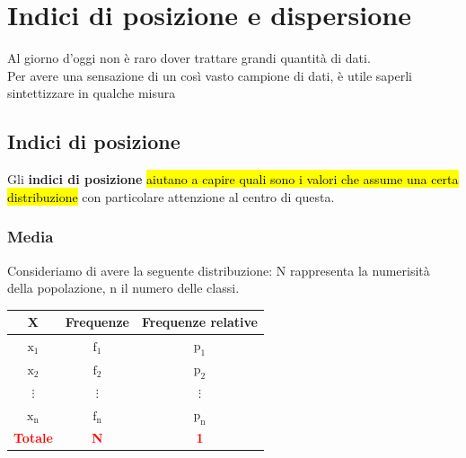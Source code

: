 
\chapter{Indici di posizione e dispersione}
Al giorno d'oggi non è raro dover trattare grandi quantità di dati.\\[0.2ex]
Per avere una sensazione di un così vasto campione di dati, è utile saperli sintettizzare in qualche misura

\section{Indici di posizione}
Gli \textcolor{viola}{\textbf{indici di posizione}} \hl{aiutano a capire quali sono i valori che assume una certa distribuzione} con particolare attenzione al centro di questa.

\subsection{Media}
Consideriamo di avere la seguente distribuzione: N rappresenta la numerisità della popolazione, n il numero delle classi.

\begin{center}
    \begin{tabular}{|c|c|c|}
        \hline
        \textbf{X} & \textbf{Frequenze} & \textbf{Frequenze relative}\\
        \hline
        $\mathrm{x_1}$ & $\mathrm{f_1}$ & $\mathrm{p_1}$\\
        $\mathrm{x_2}$ & $\mathrm{f_2}$ & $\mathrm{p_2}$\\
        $\vdots$ & $\vdots$ & $\vdots$\\
        $\mathrm{x_n}$ & $\mathrm{f_n}$ & $\mathrm{p_n}$\\
        \hline
        \textcolor{red}{\textbf{Totale}} & \textcolor{red}{\textbf{N}} & \textcolor{red}{\textbf{1}}\\
        \hline
    \end{tabular}
\end{center}


